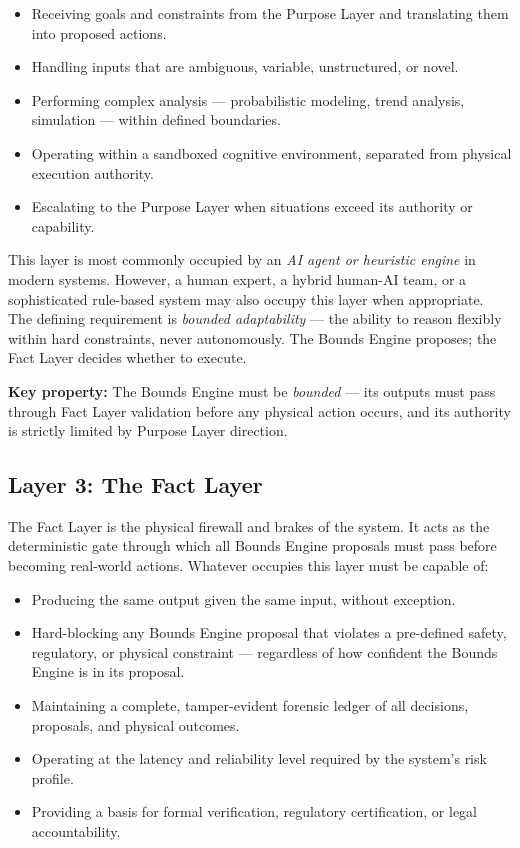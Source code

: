 \documentclass[12pt]{article}
\begin{document}
\begin{itemize}[noitemsep]
    \item Receiving goals and constraints from the Purpose Layer and translating them into proposed actions.
    \item Handling inputs that are ambiguous, variable, unstructured, or novel.
    \item Performing complex analysis --- probabilistic modeling, trend analysis, simulation --- within defined boundaries.
    \item Operating within a sandboxed cognitive environment, separated from physical execution authority.
    \item Escalating to the Purpose Layer when situations exceed its authority or capability.
\end{itemize}

This layer is most commonly occupied by an \textit{AI agent or heuristic engine} in modern systems. However, a human expert, a hybrid human-AI team, or a sophisticated rule-based system may also occupy this layer when appropriate. The defining requirement is \textit{bounded adaptability} --- the ability to reason flexibly within hard constraints, never autonomously. The Bounds Engine proposes; the Fact Layer decides whether to execute.

\textbf{Key property:} The Bounds Engine must be \textit{bounded} --- its outputs must pass through Fact Layer validation before any physical action occurs, and its authority is strictly limited by Purpose Layer direction.

\subsection{Layer 3: The Fact Layer}

The Fact Layer is the physical firewall and brakes of the system. It acts as the deterministic gate through which all Bounds Engine proposals must pass before becoming real-world actions. Whatever occupies this layer must be capable of:

\begin{itemize}[noitemsep]
    \item Producing the same output given the same input, without exception.
    \item Hard-blocking any Bounds Engine proposal that violates a pre-defined safety, regulatory, or physical constraint --- regardless of how confident the Bounds Engine is in its proposal.
    \item Maintaining a complete, tamper-evident forensic ledger of all decisions, proposals, and physical outcomes.
    \item Operating at the latency and reliability level required by the system's risk profile.
    \item Providing a basis for formal verification, regulatory certification, or legal accountability.
\end{itemize}
\end{document}
